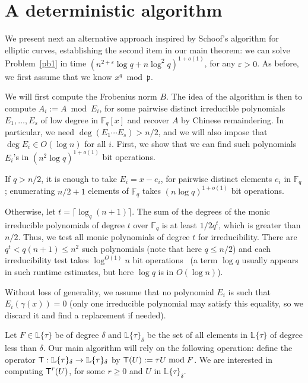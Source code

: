 \documentclass[sigconf]{acmart}
\newcommand{\F}{\mathbb{F}}
\renewcommand{\L}{\mathbb{L}}
\newcommand{\ang}[1]{\{#1\}}
\newcommand{\frakp}{\mathfrak{p}}
\begin{document}

\section{A deterministic algorithm}\label{sec:schoof}

We present next an alternative approach inspired by Schoof's algorithm
for elliptic curves, establishing the second item in our main theorem:
we can solve Problem~\ref{pb1} in time $(n^{2+\varepsilon} \log q + n
\log^2 q)^{1+o(1)}$, for any $\varepsilon > 0$. As before, we first assume 
that we know $x^q \bmod \frakp$.

\smallskip{} We will first compute the Frobenius norm
$B$. The idea of the algorithm is then to compute $A_i:=A \bmod E_i$,
for some pairwise distinct irreducible polynomials $E_1,\dots,E_s$ of
low degree in $\F_q[x]$ and recover $A$ by Chinese remaindering.  In
particular, we need $\deg(E_1 \cdots E_s) > n/2$, and we will also
impose that $\deg E_i \in O(\log n)$ for all $i$. First, we show that
we can find such polynomials $E_i$'s in $(n^2 \log q)^{1+o(1)}$ bit
operations.

If $q > n/2$, it is enough to take $E_i = x-e_i$, for pairwise
distinct elements $e_i$ in $\F_q$; enumerating $n/2+1$ elements of
$\F_q$ takes $(n \log q)^{1+o(1)}$ bit operations.

Otherwise, let $t= \lceil \log_q (n+1)\rceil$. The sum of the degrees
of the monic irreducible polynomials of degree $t$ over $\F_q$ is at
least $1/2 q^t$, which is greater than $n/2$. Thus, we test all monic
polynomials of degree $t$ for irreducibility. There are $q^t < q(n+1)
\le n^2$ such polynomials (note that here $q \le n/2$) and each
irreducibility test takes $\log^{O(1)} n$ bit
operations~\cite{vonzurGathen1992} (a term $\log q$ usually appears in
such runtime estimates, but here $\log q$ is in $O(\log n)$).

Without loss of generality, we assume that no polynomial $E_i$ is
such that $E_i(\gamma(x))=0$ (only one irreducible polynomial may
satisfy this equality, so we discard it and find a replacement if
needed).

\smallskip{} Let $F \in\L\ang{\tau}$ be of degree
$\delta$ and $\L\ang{\tau}_{\delta}$ be the set of all elements in
$\L\ang{\tau}$ of degree less than $\delta$. Our main algorithm will
rely on the following operation: define the operator $\text{\sf
  T}:\L\ang{\tau}_{\delta} \to \L\ang{\tau}_{\delta}$ by $\text{\sf
  T}(U) := \tau U \bmod F$.  We are interested in computing $\text{\sf
  T}^r(U)$, for some $r \ge 0$ and $U$ in
$\L\ang{\tau}_{\delta}$.
\end{document}
